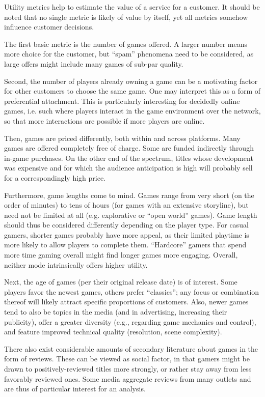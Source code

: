 Utility metrics help to estimate the value of a service for a customer.
It should be noted that no single metric is likely of value by itself,
yet all metrics somehow influence customer decisions.

The first basic metric is the number of games offered. A larger number
means more choice for the customer, but ``spam'' phenomena need to
be considered, as large offers might include many games of sub-par quality.

Second, the number of players already owning a game can be a
motivating factor for other customers to choose the same game.
One may interpret this as a form of preferential attachment.
This is particularly interesting for decidedly online games, i.e.
such where players interact in the game environment over the network,
so that more interactions are possible if more players are online.

Then, games are priced differently, both within and across
platforms. Many games are offered completely free of charge.
Some are funded indirectly through in-game purchases. On the
other end of the spectrum, titles whose development was expensive
and for which the audience anticipation is high will probably sell
for a correspondingly high price.

Furthermore, game lengths come to mind. Games range from very short
(on the order
of minutes) to tens of hours (for games with an extensive storyline),
but need not be limited at all (e.g. explorative or ``open world'' games).
Game length should thus be considered differently depending on
the player type. For casual gamers, shorter games probably have
more appeal, as their limited playtime is more likely to allow
players to complete them. ``Hardcore'' gamers that spend more
time gaming overall might find longer games more engaging.
Overall, neither mode intrinsically offers higher utility.

Next, the age of games (per their original release date) is of
interest. Some players favor the newest games, others prefer ``classics'';
any focus or combination thereof will likely attract specific
proportions of customers. Also, newer games tend to also be topics
in the media (and in advertising, increasing their publicity),
offer a greater diversity (e.g., regarding game mechanics and control),
and feature improved technical quality (resolution, scene complexity).


There also exist considerable amounts of secondary literature about
games in the form of reviews. These can be viewed as social factor,
in that gamers might be drawn to positively-reviewed titles more
strongly, or rather stay away from less favorably reviewed ones.
Some media aggregate reviews from many outlets and
are thus of particular interest for an analysis.

